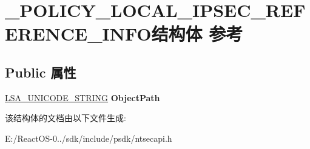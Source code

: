 \hypertarget{struct___p_o_l_i_c_y___l_o_c_a_l___i_p_s_e_c___r_e_f_e_r_e_n_c_e___i_n_f_o}{}\section{\+\_\+\+P\+O\+L\+I\+C\+Y\+\_\+\+L\+O\+C\+A\+L\+\_\+\+I\+P\+S\+E\+C\+\_\+\+R\+E\+F\+E\+R\+E\+N\+C\+E\+\_\+\+I\+N\+F\+O结构体 参考}
\label{struct___p_o_l_i_c_y___l_o_c_a_l___i_p_s_e_c___r_e_f_e_r_e_n_c_e___i_n_f_o}
\subsection*{Public 属性}
\begin{DoxyCompactItemize}
\item 
\mbox{\label{struct___p_o_l_i_c_y___l_o_c_a_l___i_p_s_e_c___r_e_f_e_r_e_n_c_e___i_n_f_o_a67e85d0ce9fe4981e568ebaaee10135d}} 
\hyperlink{struct___l_s_a___u_n_i_c_o_d_e___s_t_r_i_n_g}{L\+S\+A\+\_\+\+U\+N\+I\+C\+O\+D\+E\+\_\+\+S\+T\+R\+I\+NG} {\bfseries Object\+Path}
\end{DoxyCompactItemize}


该结构体的文档由以下文件生成\+:\begin{DoxyCompactItemize}
\item 
E\+:/\+React\+O\+S-\/0../sdk/include/psdk/ntsecapi.\+h\end{DoxyCompactItemize}
